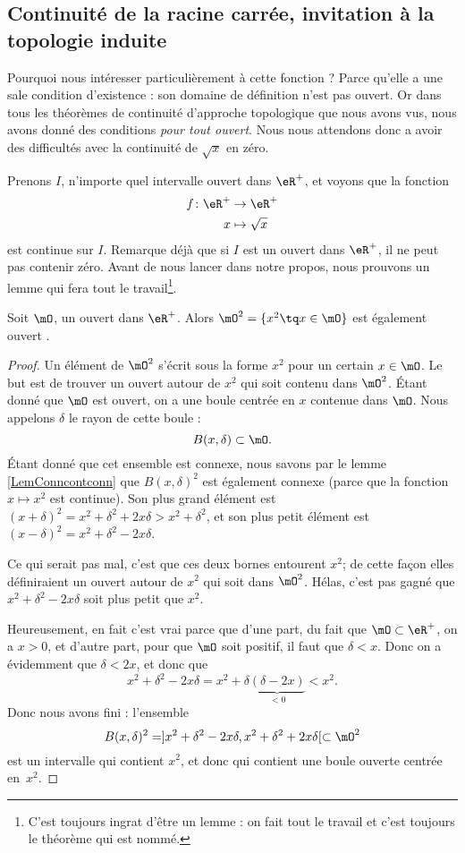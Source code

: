 \subsection{Continuité de la racine carrée, invitation à la topologie induite}

Pourquoi nous intéresser particulièrement à cette fonction ? Parce qu'elle a une sale condition d'existence : son domaine de définition n'est pas ouvert. Or dans tous les théorèmes de continuité d'approche topologique que nous avons vus, nous avons donné des conditions \emph{pour tout ouvert}. Nous nous attendons donc a avoir des difficultés avec la continuité de $\sqrt{x}$ en zéro.

Prenons $I$, n'importe quel intervalle ouvert dans $\eR^+$, et voyons que la fonction
\begin{equation}
\begin{aligned}
 f\colon \eR^+&\to \eR^+ \\ 
   x&\mapsto \sqrt{x} 
\end{aligned}
\end{equation}
est continue sur $I$. Remarque déjà que si $I$ est un ouvert dans $\eR^+$, il ne peut pas contenir zéro. Avant de nous lancer dans notre propos, nous prouvons un lemme qui fera tout le travail\footnote{C'est toujours ingrat d'être un lemme : on fait tout le travail et c'est toujours le théorème qui est nommé.}.

\begin{lemma}
Soit $\mO$, un ouvert dans $\eR^+$. Alors $\mO^2=\{ x^2\tq x\in\mO \}$ est également ouvert .
\end{lemma}

\begin{proof}
Un élément de $\mO^2$ s'écrit sous la forme $x^2$ pour un certain $x\in\mO$. Le but est de trouver un ouvert autour de $x^2$ qui soit contenu dans $\mO^2$. Étant donné que $\mO$ est ouvert, on a une boule centrée en $x$ contenue dans $\mO$. Nous appelons $\delta$ le rayon de cette boule :
\[ 
  B(x,\delta)\subset\mO.
\]
Étant donné que cet ensemble est connexe, nous savons par le lemme \ref{LemConncontconn} que $B(x,\delta)^2$ est également connexe (parce que la fonction $x\mapsto x^2$ est continue). Son plus grand élément est $(x+\delta)^2=x^2+\delta^2+2x\delta>x^2+\delta^2$, et son plus petit élément est $(x-\delta)^2=x^2+\delta^2-2x\delta$. 

Ce qui serait pas mal, c'est que ces deux bornes entourent $x^2$; de cette façon elles définiraient un ouvert autour de $x^2$ qui soit dans $\mO^2$. Hélas, c'est pas gagné que $x^2+\delta^2-2x\delta$ soit plus petit que $x^2$. 

Heureusement, en fait c'est vrai parce que d'une part, du fait que $\mO\subset\eR^+$, on a $x>0$, et d'autre part, pour que $\mO$ soit positif, il faut que $\delta<x$. Donc on a évidemment que $\delta<2x$, et donc que
\[ 
  x^2+\delta^2-2x\delta=x^2+\delta\underbrace{(\delta-2x)}_{<0}<x^2.
\]
Donc nous avons fini : l'ensemble
\[ 
  B(x,\delta)^2=]x^2+\delta^2-2x\delta,x^2+\delta^2+2x\delta[\subset\mO^2
\]
est un intervalle qui contient $x^2$, et donc qui contient une boule ouverte centrée en~$x^2$.

\end{proof}

